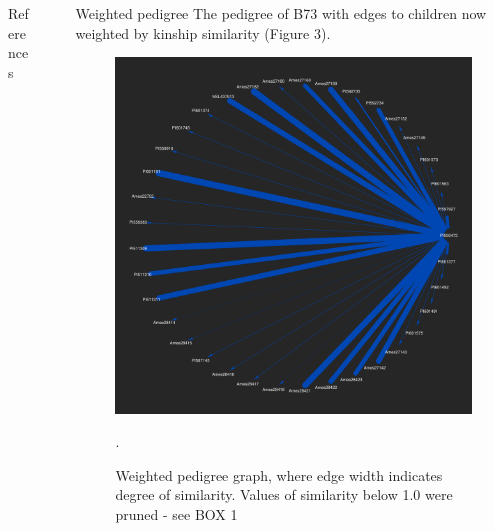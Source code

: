 \documentclass[final]{beamer}
\newlength{\sepwid}
\newlength{\onecolwid}
\begin{document}
\begin{frame}[t]
\begin{columns}[t]
\begin{column}{\onecolwid}
\begin{block}{References}
\end{block}

\end{column} %

\begin{column}{\sepwid}\end{column} %

\begin{column}{\onecolwid} %

\begin{block}{Weighted pedigree}
The pedigree of B73 with edges to children now weighted by kinship similarity (Figure 3).
\begin{figure}
\includegraphics[width=1.0\linewidth]{weighted.pdf}
\caption{Weighted pedigree graph, where edge width indicates degree of similarity. Values of similarity below 1.0 were pruned - see BOX 1}.
\end{figure}

\end{block}



\end{column}
\end{columns}
\end{frame}
\end{document}
